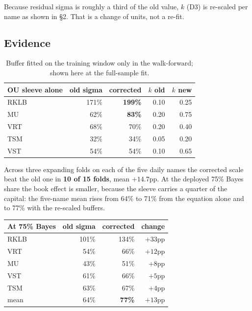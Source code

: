 \documentclass[11pt]{article}
\begin{document}
Because residual sigma is roughly a third of the old value, $k$ (D3) is re-scaled per name as
shown in \S2. That is a change of units, not a re-fit.

\subsection{Evidence}

\begin{table}[H]\centering\small
\begin{tabular}{lrrrr}
\toprule
\textbf{OU sleeve alone} & \textbf{old sigma} & \textbf{corrected} & \textbf{$k$ old} &
\textbf{$k$ new}\\
\midrule
\rowcolor{bckeep} RKLB & 171\% & \textbf{199\%} & 0.10 & 0.25\\
MU   & 62\%  & \textbf{83\%}  & 0.20 & 0.75\\
\rowcolor{bckeep} VRT  & 68\%  & 70\%           & 0.20 & 0.40\\
TSM  & 32\%  & 34\%           & 0.05 & 0.20\\
\rowcolor{bckeep} VST  & 54\%  & 54\%           & 0.10 & 0.65\\
\bottomrule
\end{tabular}
\caption{Buffer fitted on the training window only in the walk-forward; shown here at the
full-sample fit.}
\end{table}

Across three expanding folds on each of the five daily names the corrected scale beat the old one
in \textbf{10 of 15 folds}, mean $+14.7$pp. At the deployed 75\% Bayes share the book effect is
smaller, because the sleeve carries a quarter of the capital: the five-name mean rises from 64\%
to 71\% from the equation alone and to 77\% with the re-scaled buffers.

\begin{table}[H]\centering\small
\begin{tabular}{lrrr}
\toprule
\textbf{At 75\% Bayes} & \textbf{old sigma} & \textbf{corrected} & \textbf{change}\\
\midrule
\rowcolor{bckeep} RKLB & 101\% & 134\% & $+33$pp\\
VRT  & 54\%  & 66\%  & $+12$pp\\
\rowcolor{bckeep} MU   & 43\%  & 51\%  & $+8$pp\\
VST  & 61\%  & 66\%  & $+5$pp\\
\rowcolor{bckeep} TSM  & 63\%  & 67\%  & $+4$pp\\
\midrule
mean & 64\% & \textbf{77\%} & $+13$pp\\
\bottomrule
\end{tabular}
\end{table}
\end{document}
